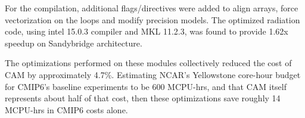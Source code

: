 For the compilation, additional flags/directives were added to align arrays, force vectorization on the loops and modify precision models. 
The optimized radiation code, using intel 15.0.3 compiler and MKL 11.2.3, was found to provide 1.62x speedup on Sandybridge architecture. 

The optimizations performed on these modules collectively reduced the cost of CAM by approximately 4.7\%. Estimating NCAR’s Yellowstone core-hour budget for CMIP6’s baseline experiments to be 600 MCPU-hrs, and that CAM itself represents about half of that cost, then these optimizations save roughly 14 MCPU-hrs in CMIP6 costs alone. 
